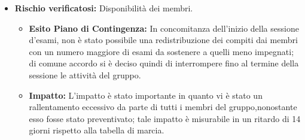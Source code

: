 \begin{itemize}
\item \textbf{Rischio verificatosi:} Disponibilità dei membri.
\begin{itemize}
    \item \textbf{Esito Piano di Contingenza:} In concomitanza dell'inizio della sessione d'esami, non è stato possibile una redistribuzione dei compiti dai membri
    con un numero maggiore di esami da sostenere a quelli meno impegnati; di comune accordo si è deciso quindi di interrompere fino al termine della sessione
    le attività del gruppo.
    \item \textbf{Impatto:} L'impatto è stato importante in quanto vi è stato un rallentamento eccessivo da parte di tutti i membri del gruppo,nonostante
    esso fosse stato preventivato; tale impatto è misurabile in un ritardo di 14 giorni rispetto alla tabella di marcia.
\end{itemize}
\end{itemize}

